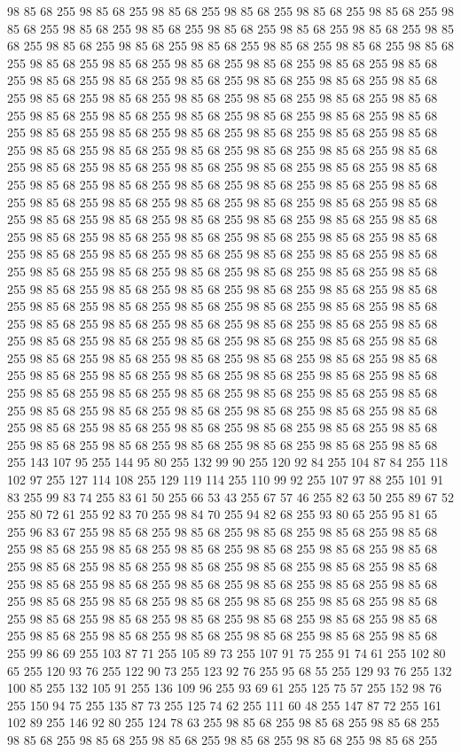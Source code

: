 98 85 68 255 98 85 68 255 98 85 68 255 98 85 68 255 98 85 68 255 98 85 68 255 98 85 68 255 98 85 68 255 98 85 68 255 98 85 68 255 98 85 68 255 98 85 68 255 98 85 68 255 98 85 68 255 98 85 68 255 98 85 68 255 98 85 68 255 98 85 68 255 98 85 68 255 98 85 68 255 98 85 68 255 98 85 68 255 98 85 68 255 98 85 68 255 98 85 68 255 98 85 68 255 98 85 68 255 98 85 68 255 98 85 68 255 98 85 68 255 98 85 68 255 98 85 68 255 98 85 68 255 98 85 68 255 98 85 68 255 98 85 68 255 98 85 68 255 98 85 68 255 98 85 68 255 98 85 68 255 98 85 68 255 98 85 68 255 98 85 68 255 98 85 68 255 98 85 68 255 98 85 68 255 98 85 68 255 98 85 68 255 98 85 68 255 98 85 68 255 98 85 68 255 98 85 68 255 98 85 68 255 98 85 68 255 98 85 68 255 98 85 68 255 98 85 68 255 98 85 68 255 98 85 68 255 98 85 68 255 98 85 68 255 98 85 68 255 98 85 68 255 98 85 68 255
98 85 68 255 98 85 68 255 98 85 68 255 98 85 68 255 98 85 68 255 98 85 68 255 98 85 68 255 98 85 68 255 98 85 68 255 98 85 68 255 98 85 68 255 98 85 68 255 98 85 68 255 98 85 68 255 98 85 68 255 98 85 68 255 98 85 68 255 98 85 68 255 98 85 68 255 98 85 68 255 98 85 68 255 98 85 68 255 98 85 68 255 98 85 68 255 98 85 68 255 98 85 68 255 98 85 68 255 98 85 68 255 98 85 68 255 98 85 68 255 98 85 68 255 98 85 68 255 98 85 68 255 98 85 68 255 98 85 68 255 98 85 68 255 98 85 68 255 98 85 68 255 98 85 68 255 98 85 68 255 98 85 68 255 98 85 68 255 98 85 68 255 98 85 68 255 98 85 68 255 98 85 68 255 98 85 68 255 98 85 68 255 98 85 68 255 98 85 68 255 98 85 68 255 98 85 68 255 98 85 68 255 98 85 68 255 98 85 68 255 98 85 68 255 98 85 68 255 98 85 68 255 98 85 68 255 98 85 68 255 98 85 68 255 98 85 68 255 98 85 68 255 98 85 68 255
98 85 68 255 98 85 68 255 98 85 68 255 98 85 68 255 98 85 68 255 98 85 68 255 98 85 68 255 98 85 68 255 98 85 68 255 98 85 68 255 98 85 68 255 98 85 68 255 98 85 68 255 98 85 68 255 98 85 68 255 98 85 68 255 98 85 68 255 98 85 68 255 98 85 68 255 98 85 68 255 98 85 68 255 98 85 68 255 98 85 68 255 98 85 68 255 98 85 68 255 98 85 68 255 98 85 68 255 98 85 68 255 98 85 68 255 143 107 95 255 144 95 80 255 132 99 90 255 120 92 84 255 104 87 84 255 118 102 97 255 127 114 108 255 129 119 114 255 110 99 92 255 107 97 88 255 101 91 83 255 99 83 74 255 83 61 50 255 66 53 43 255 67 57 46 255 82 63 50 255 89 67 52 255 80 72 61 255 92 83 70 255 98 84 70 255 94 82 68 255 93 80 65 255 95 81 65 255 96 83 67 255 98 85 68 255 98 85 68 255 98 85 68 255 98 85 68 255 98 85 68 255 98 85 68 255 98 85 68 255 98 85 68 255 98 85 68 255 98 85 68 255 98 85 68 255
98 85 68 255 98 85 68 255 98 85 68 255 98 85 68 255 98 85 68 255 98 85 68 255 98 85 68 255 98 85 68 255 98 85 68 255 98 85 68 255 98 85 68 255 98 85 68 255 98 85 68 255 98 85 68 255 98 85 68 255 98 85 68 255 98 85 68 255 98 85 68 255 98 85 68 255 98 85 68 255 98 85 68 255 98 85 68 255 98 85 68 255 98 85 68 255 98 85 68 255 98 85 68 255 98 85 68 255 98 85 68 255 98 85 68 255 98 85 68 255 99 86 69 255 103 87 71 255 105 89 73 255 107 91 75 255 91 74 61 255 102 80 65 255 120 93 76 255 122 90 73 255 123 92 76 255 95 68 55 255 129 93 76 255 132 100 85 255 132 105 91 255 136 109 96 255 93 69 61 255 125 75 57 255 152 98 76 255 150 94 75 255 135 87 73 255 125 74 62 255 111 60 48 255 147 87 72 255 161 102 89 255 146 92 80 255 124 78 63 255 98 85 68 255 98 85 68 255 98 85 68 255 98 85 68 255 98 85 68 255 98 85 68 255 98 85 68 255 98 85 68 255 98 85 68 255
